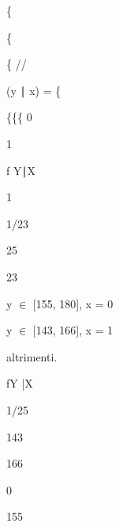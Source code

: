 \documentclass[a4paper,portrait,12pt]{article}
\begin{document}
\{





\{





\{ //


\begin{flushleft}
(y ∣ x) = \{
\end{flushleft}


\{\{\{ 0


1





\begin{flushleft}
f Y∣X
\end{flushleft}





1





1/23





25


23





\begin{flushleft}
y $\in$ [155, 180], x = 0
\end{flushleft}


\begin{flushleft}
y $\in$ [143, 166], x = 1
\end{flushleft}


\begin{flushleft}
altrimenti.
\end{flushleft}





\begin{flushleft}
fY |X
\end{flushleft}





1/25


143





166





0


155
\end{document}

